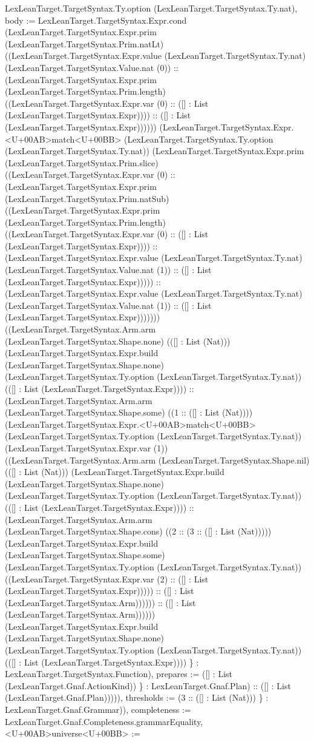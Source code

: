\documentclass[11pt]{article}
\begin{document}
LexLeanTarget.TargetSyntax.Ty.option (LexLeanTarget.TargetSyntax.Ty.nat), body := LexLeanTarget.TargetSyntax.Expr.cond (LexLeanTarget.TargetSyntax.Expr.prim (LexLeanTarget.TargetSyntax.Prim.natLt) ((LexLeanTarget.TargetSyntax.Expr.value (LexLeanTarget.TargetSyntax.Ty.nat) (LexLeanTarget.TargetSyntax.Value.nat (0)) :: (LexLeanTarget.TargetSyntax.Expr.prim (LexLeanTarget.TargetSyntax.Prim.length) ((LexLeanTarget.TargetSyntax.Expr.var (0) :: ([] : List (LexLeanTarget.TargetSyntax.Expr)))) :: ([] : List (LexLeanTarget.TargetSyntax.Expr)))))) (LexLeanTarget.TargetSyntax.Expr.<U+00AB>match<U+00BB> (LexLeanTarget.TargetSyntax.Ty.option (LexLeanTarget.TargetSyntax.Ty.nat)) (LexLeanTarget.TargetSyntax.Expr.prim (LexLeanTarget.TargetSyntax.Prim.slice) ((LexLeanTarget.TargetSyntax.Expr.var (0) :: (LexLeanTarget.TargetSyntax.Expr.prim (LexLeanTarget.TargetSyntax.Prim.natSub) ((LexLeanTarget.TargetSyntax.Expr.prim (LexLeanTarget.TargetSyntax.Prim.length) ((LexLeanTarget.TargetSyntax.Expr.var (0) :: ([] : List (LexLeanTarget.TargetSyntax.Expr)))) :: (LexLeanTarget.TargetSyntax.Expr.value (LexLeanTarget.TargetSyntax.Ty.nat) (LexLeanTarget.TargetSyntax.Value.nat (1)) :: ([] : List (LexLeanTarget.TargetSyntax.Expr))))) :: (LexLeanTarget.TargetSyntax.Expr.value (LexLeanTarget.TargetSyntax.Ty.nat) (LexLeanTarget.TargetSyntax.Value.nat (1)) :: ([] : List (LexLeanTarget.TargetSyntax.Expr))))))) ((LexLeanTarget.TargetSyntax.Arm.arm (LexLeanTarget.TargetSyntax.Shape.none) (([] : List (Nat))) (LexLeanTarget.TargetSyntax.Expr.build (LexLeanTarget.TargetSyntax.Shape.none) (LexLeanTarget.TargetSyntax.Ty.option (LexLeanTarget.TargetSyntax.Ty.nat)) (([] : List (LexLeanTarget.TargetSyntax.Expr)))) :: (LexLeanTarget.TargetSyntax.Arm.arm (LexLeanTarget.TargetSyntax.Shape.some) ((1 :: ([] : List (Nat)))) (LexLeanTarget.TargetSyntax.Expr.<U+00AB>match<U+00BB> (LexLeanTarget.TargetSyntax.Ty.option (LexLeanTarget.TargetSyntax.Ty.nat)) (LexLeanTarget.TargetSyntax.Expr.var (1)) ((LexLeanTarget.TargetSyntax.Arm.arm (LexLeanTarget.TargetSyntax.Shape.nil) (([] : List (Nat))) (LexLeanTarget.TargetSyntax.Expr.build (LexLeanTarget.TargetSyntax.Shape.none) (LexLeanTarget.TargetSyntax.Ty.option (LexLeanTarget.TargetSyntax.Ty.nat)) (([] : List (LexLeanTarget.TargetSyntax.Expr)))) :: (LexLeanTarget.TargetSyntax.Arm.arm (LexLeanTarget.TargetSyntax.Shape.cons) ((2 :: (3 :: ([] : List (Nat))))) (LexLeanTarget.TargetSyntax.Expr.build (LexLeanTarget.TargetSyntax.Shape.some) (LexLeanTarget.TargetSyntax.Ty.option (LexLeanTarget.TargetSyntax.Ty.nat)) ((LexLeanTarget.TargetSyntax.Expr.var (2) :: ([] : List (LexLeanTarget.TargetSyntax.Expr))))) :: ([] : List (LexLeanTarget.TargetSyntax.Arm)))))) :: ([] : List (LexLeanTarget.TargetSyntax.Arm)))))) (LexLeanTarget.TargetSyntax.Expr.build (LexLeanTarget.TargetSyntax.Shape.none) (LexLeanTarget.TargetSyntax.Ty.option (LexLeanTarget.TargetSyntax.Ty.nat)) (([] : List (LexLeanTarget.TargetSyntax.Expr)))) \} : LexLeanTarget.TargetSyntax.Function), prepares := ([] : List (LexLeanTarget.Gnaf.ActionKind)) \} : LexLeanTarget.Gnaf.Plan) :: ([] : List (LexLeanTarget.Gnaf.Plan))))), thresholds := (3 :: ([] : List (Nat))) \} : LexLeanTarget.Gnaf.Grammar)), completeness := LexLeanTarget.Gnaf.Completeness.grammarEquality, <U+00AB>universe<U+00BB> := 
\end{document}
